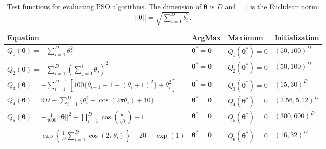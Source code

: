 \documentclass[12pt]{article}
\begin{document}
\begin{table}[h]
\centering
\begin{tabular}{llll}
 Equation & ArgMax & Maximum & Initialization \\\hline
 $Q_1(\bm{\theta}) = -\sum_{i=1}^D\theta_i^2$ & $\bm{\theta}^* = \bm{0}$ & $Q_1(\bm{\theta}^*) = 0$  & $(50, 100)^D$ \\
 $Q_2(\bm{\theta}) = -\sum_{i=1}^D\left(\sum_{j=1}^i \theta_j\right)^2 $ & $\bm{\theta}^* = \bm{0}$ & $Q_2(\bm{\theta}^*) = 0$ & $(50, 100)^D$ \\
 $Q_3(\bm{\theta}) = -\sum_{i=1}^{D-1}\left[100\{\theta_{i+1} + 1 - (\theta_i + 1)^2\} + \theta_i^2\right]$ & $\bm{\theta}^* = \bm{0}$ & $Q_3(\bm{\theta}^*) = 0$ & $(15, 30)^D$ \\
 $Q_4(\bm{\theta}) = 9D - \sum_{i=1}^D\{\theta_i^2 - \cos(2\pi \theta_i) + 10\}$ & $\bm{\theta}^*=\bm{0}$ & $Q_4(\bm{\theta}^*) = 0$ & $(2.56, 5.12)^D$ \\
 $Q_5(\bm{\theta}) = -\frac{1}{4000}||\bm{\theta}||^2 + \prod_{i=1}^D\cos\left(\frac{\theta_i}{\sqrt{i}}\right) - 1$ & $\bm{\theta}^* = \bm{0}$ & $Q_5(\bm{\theta}^*) = 0$ & $(300, 600)^D$ \\
 \shortstack[l]{$Q_6(\bm{\theta}) = 20\exp\left(-0.2\sqrt{\frac{1}{D}||\bm{\theta}||}\right)$ \\ \ \ \ \ \ \ \ \ $+ \exp\left\{\frac{1}{D}\sum_{i=1}^D\cos(2\pi \theta_i)\right\} - 20 - \exp(1)$} & $\bm{\theta}^* = \bm{0}$ & $Q_6(\bm{\theta}^*) = 0$ & $(16, 32)^D$\\\hline
\end{tabular}
\caption{Test functions for evaluating PSO algorithms. The dimension of $\bm{\theta}$ is $D$ and $||.||$ is the Euclidean norm: $||\bm{\theta}|| = \sqrt{\sum_{i=1}^D\theta_i^2}$.} 
\label{tab:testfuns}
\end{table}
\end{document}
